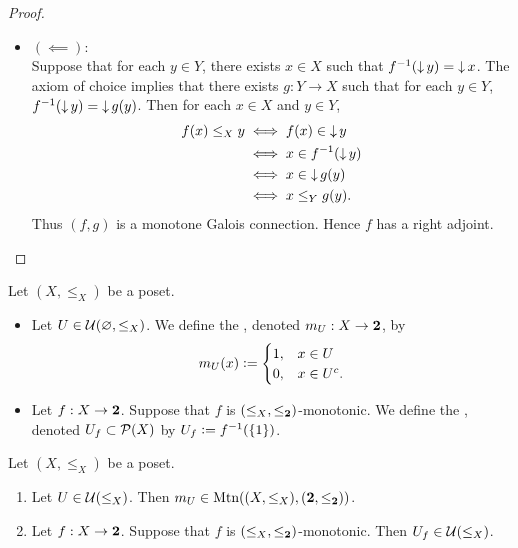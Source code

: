 \documentclass{book}
\begin{document}
\begin{proof}
\begin{itemize}
			\item $(\impliedby)$: \\
			Suppose that for each $y \in Y$, there exists $x \in X$ such that $f^{-1}(\operatorname{\downarrow} y) = \operatorname{\downarrow} x$. The axiom of choice implies that there exists $g:Y \rightarrow X$ such that for each $y \in Y$, $f^{-1}(\operatorname{\downarrow} y) = \operatorname{\downarrow} g(y)$. Then for each $x \in X$ and $y \in Y$, 
			\begin{align*}
				f(x) \leq_X y
				& \iff f(x) \in \operatorname{\downarrow} y \\
				& \iff x \in f^{-1}(\operatorname{\downarrow} y) \\
				& \iff x \in \operatorname{\downarrow} g(y) \\
				& \iff x \leq_Y g(y).
			\end{align*}
			Thus $(f, g)$ is a monotone Galois connection. Hence $f$ has a right adjoint.
		\end{itemize}
	\end{proof}
	
	\begin{defn} 
		Let $(X, \leq_X)$ be a poset.
		\begin{itemize}
			\item Let $U \in \mathcal{U}(\varnothing, \leq_X)$. We define the , denoted $m_U:X \rightarrow \mathbf{2}$, by 
			\[
			m_U(x) \vcentcolon= 
			\begin{cases}
				1, & x \in U \\
				0, & x \in U^c.
			\end{cases}
			\]
			\item Let $f:X \rightarrow \mathbf{2}$. Suppose that $f$ is $(\leq_X, \leq_{\mathbf{2}})$-monotonic. We define the , denoted $U_f \subset \mathcal{P}(X)$ by $U_f \vcentcolon= f^{-1}(\{1\})$. 
		\end{itemize}
	\end{defn}
	
	\begin{ex} 
		Let $(X, \leq_X)$ be a poset.
		\begin{enumerate}
			\item Let $U \in \mathcal{U}(\leq_X)$. Then $m_U \in \operatorname{\text{Mtn}}((X, \leq_X), (\mathbf{2}, \leq_{\mathbf{2}}))$.
			\item Let $f:X \rightarrow \mathbf{2}$. Suppose that $f$ is $(\leq_X, \leq_{\mathbf{2}})$-monotonic. Then $U_f \in \mathcal{U}(\leq_X)$.
		\end{enumerate}
	\end{ex}
	
\end{document}
